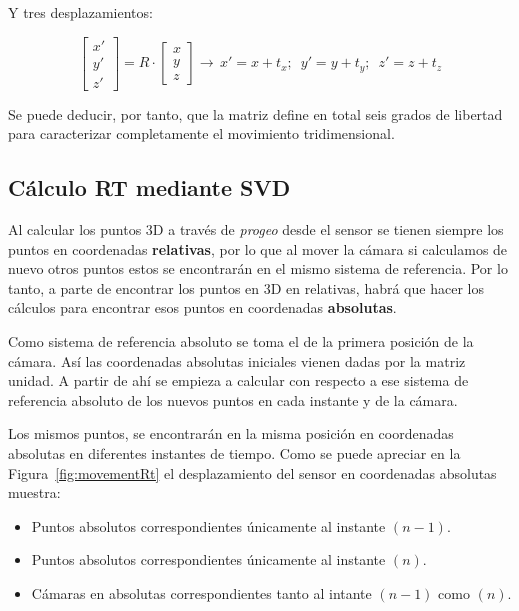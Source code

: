 Y tres desplazamientos:

\begin{equation}
\left[\begin{array}{c}
x'\\
y'\\
z'
\end{array}\right]=R\cdot\left[\begin{array}{c}
x\\
y\\
z
\end{array}\right]\longrightarrow\, x'=x+t_{x};\,\,\, y'=y+t_{y};\,\,\, z'=z+t_{z}
\end{equation}

Se puede deducir, por tanto, que la matriz define en total seis grados de libertad para caracterizar completamente el movimiento tridimensional.

\subsection{Cálculo RT mediante SVD}

Al calcular los puntos 3D a través de \textit{progeo} desde el sensor se tienen siempre los puntos en coordenadas \textbf{relativas}, por lo que al mover la cámara si calculamos de nuevo otros puntos estos se encontrarán en el mismo sistema de referencia. Por lo tanto, a parte de encontrar los puntos en 3D en relativas, habrá que hacer los cálculos para encontrar esos puntos en coordenadas \textbf{absolutas}.

Como sistema de referencia absoluto se toma el de la primera posición de la cámara. Así las coordenadas absolutas iniciales vienen dadas por la matriz unidad. A partir de ahí se empieza a calcular con respecto a ese sistema de referencia absoluto de los nuevos puntos en cada instante y de la cámara.

Los mismos puntos, se encontrarán en la misma posición en coordenadas absolutas en diferentes instantes de tiempo. Como se puede apreciar en la Figura~\ref{fig:movementRt} el desplazamiento del sensor en coordenadas absolutas muestra:

\begin{itemize}
\item Puntos absolutos correspondientes únicamente al instante $(n-1)$.
\item Puntos absolutos correspondientes únicamente al instante $(n)$.
\item Cámaras en absolutas correspondientes tanto al intante $(n-1)$ como $(n)$.
\end{itemize}

